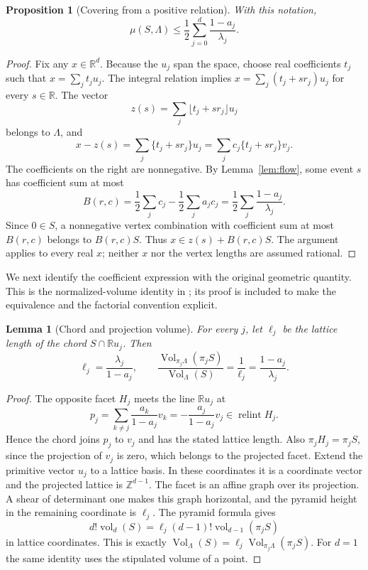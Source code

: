\documentclass[11pt,a4paper]{article}
\newtheorem{lemma}[theorem]{Lemma}
\newtheorem{proposition}[theorem]{Proposition}
\theoremstyle{definition}\newtheorem{definition}[theorem]{Definition}
\theoremstyle{remark}\newtheorem{remark}[theorem]{Remark}
\DeclareMathOperator{\Vol}{Vol}
\DeclareMathOperator{\vol}{vol}
\DeclareMathOperator{\relint}{relint}
\newcommand{\R}{\mathbb R}\newcommand{\Z}{\mathbb Z}
\begin{document}
\begin{proposition}[Covering from a positive relation]\label{prop:coverflow}
With this notation,
\begin{equation}\label{eq:coefficientcover}
 \mu(S,\Lambda)\le\frac12\sum_{j=0}^d
                        \frac{1-a_j}{\lambda_j}.
\end{equation}
\end{proposition}
\begin{proof}
Fix any $x\in\R^d$. Because the $u_j$ span the space, choose real
coefficients $t_j$ such that $x=\sum_jt_ju_j$. The integral relation
implies $x=\sum_j(t_j+sr_j)u_j$ for every $s\in\R$. The vector
\[
 z(s)=\sum_j\lfloor t_j+sr_j\rfloor u_j
\]
belongs to $\Lambda$, and
\begin{equation}\label{eq:rounding}
 x-z(s)=\sum_j\{t_j+sr_j\}u_j
       =\sum_jc_j\{t_j+sr_j\}v_j.
\end{equation}
The coefficients on the right are nonnegative. By
Lemma~\ref{lem:flow}, some event $s$ has coefficient sum at most
\[
 B(r,c)=\frac12\sum_jc_j-
             \frac12\sum_ja_jc_j
        =\frac12\sum_j\frac{1-a_j}{\lambda_j}.
\]
Since $0\in S$, a nonnegative vertex combination with coefficient
sum at most $B(r,c)$ belongs to $B(r,c)S$. Thus
$x\in z(s)+B(r,c)S$. The argument applies to every real $x$;
neither $x$ nor the vertex lengths are assumed rational.
\end{proof}

We next identify the coefficient expression with the original
geometric quantity. This is the normalized-volume identity in
\cite[Lemma 4.1]{CSS}; its proof is included to make the equivalence
and the factorial convention explicit.

\begin{lemma}[Chord and projection volume]\label{lem:volume}
For every $j$, let $\ell_j$ be the lattice length of the chord
$S\cap\R u_j$. Then
\begin{equation}\label{eq:volumeidentity}
 \ell_j=\frac{\lambda_j}{1-a_j},\qquad
 \frac{\Vol_{\pi_j\Lambda}(\pi_j S)}{\Vol_\Lambda(S)}
     =\frac1{\ell_j}=\frac{1-a_j}{\lambda_j}.
\end{equation}
\end{lemma}
\begin{proof}
The opposite facet $H_j$ meets the line $\R u_j$ at
\[
 p_j=\sum_{k\ne j}\frac{a_k}{1-a_j}v_k
     =-\frac{a_j}{1-a_j}v_j\in\relint H_j.
\]
Hence the chord joins $p_j$ to $v_j$ and has the stated lattice
length. Also $\pi_jH_j=\pi_jS$, since the projection of $v_j$ is
zero, which belongs to the projected facet. Extend the primitive
vector $u_j$ to a lattice basis. In these coordinates it is a
coordinate vector and the projected lattice is $\Z^{d-1}$.
The facet is an affine graph over its projection. A shear of
determinant one makes this graph horizontal, and the pyramid height
in the remaining coordinate is $\ell_j$. The pyramid formula gives
\[
 d!\vol_d(S)=\ell_j(d-1)!\vol_{d-1}(\pi_jS)
\]
in lattice coordinates. This is exactly
$\Vol_\Lambda(S)=\ell_j\Vol_{\pi_j\Lambda}(\pi_jS)$.
For $d=1$ the same identity uses the stipulated volume of a point.
\end{proof}
\end{document}
